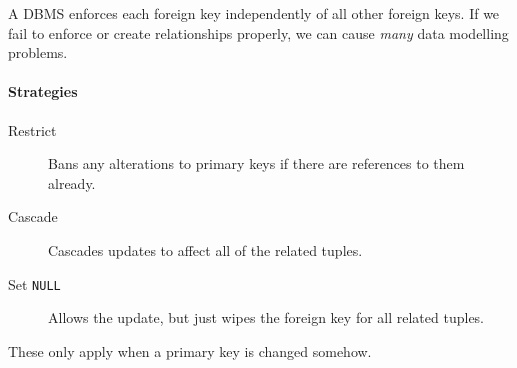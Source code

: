 A DBMS enforces each foreign key independently of all other foreign keys.
If we fail to enforce or create relationships properly, we can cause \emph{many} data modelling problems.

\paragraph{Strategies}\label{par:strategies}

\begin{description}
    \item[Restrict] Bans any alterations to primary keys if there are references to them already.
    \item[Cascade] Cascades updates to affect all of the related tuples.
    \item[Set \texttt{NULL}] Allows the update, but just wipes the foreign key for all related tuples.
\end{description}

\begin{note}
    These only apply when a primary key is changed somehow.
\end{note}

